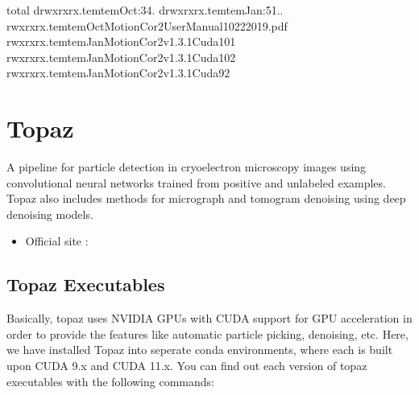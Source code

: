 \documentclass[a4paper,10pt,english]{sphinxmanual}
\begin{document}
\begin{sphinxVerbatim}[commandchars=\\\{\}]
total
drwxr\PYGZhy{}xr\PYGZhy{}x.temtemOct:34.
drwxr\PYGZhy{}xr\PYGZhy{}x.temtemJan:51..
\PYGZhy{}rwxr\PYGZhy{}xr\PYGZhy{}x.temtemOctMotionCor2\PYGZhy{}UserManual\PYGZhy{}10\PYGZhy{}22\PYGZhy{}2019.pdf
\PYGZhy{}rwxr\PYGZhy{}xr\PYGZhy{}x.temtemJanMotionCor2\PYGZus{}v1.3.1\PYGZhy{}Cuda101
\PYGZhy{}rwxr\PYGZhy{}xr\PYGZhy{}x.temtemJanMotionCor2\PYGZus{}v1.3.1\PYGZhy{}Cuda102
\PYGZhy{}rwxr\PYGZhy{}xr\PYGZhy{}x.temtemJanMotionCor2\PYGZus{}v1.3.1\PYGZhy{}Cuda92
\end{sphinxVerbatim}

\sphinxstepscope


\chapter{Topaz}
\label{\detokenize{topaz:topaz}}\label{\detokenize{topaz:id1}}\label{\detokenize{topaz::doc}}
\sphinxAtStartPar
A pipeline for particle detection in cryo\sphinxhyphen{}electron microscopy images using convolutional neural networks trained from positive and unlabeled examples.
Topaz also includes methods for micrograph and tomogram denoising using deep denoising models.
\begin{itemize}
\item {} 
\sphinxAtStartPar
Official  site : 

\end{itemize}


\section{Topaz Executables}
\label{\detokenize{topaz:topaz-executables}}
\sphinxAtStartPar
Basically, topaz uses NVIDIA GPUs with CUDA support for GPU acceleration in order to provide the features like automatic particle picking, denoising, etc.
Here, we have installed Topaz into seperate conda environments, where each is built upon CUDA 9.x and CUDA 11.x.
You can find out each version of topaz executables with the following commands:
\end{document}
